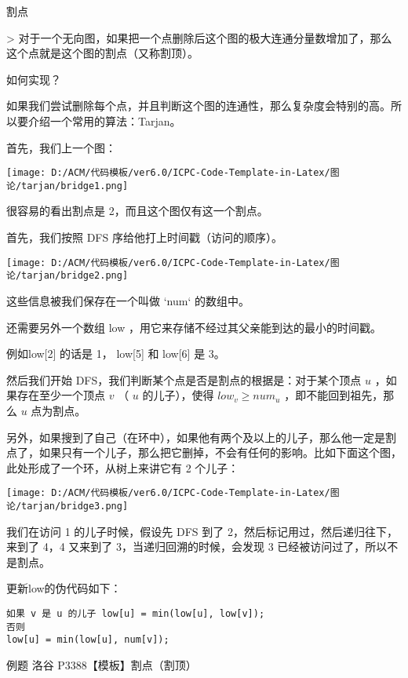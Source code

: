 割点

> 对于一个无向图，如果把一个点删除后这个图的极大连通分量数增加了，那么这个点就是这个图的割点（又称割顶）。

如何实现？

如果我们尝试删除每个点，并且判断这个图的连通性，那么复杂度会特别的高。所以要介绍一个常用的算法：Tarjan。

首先，我们上一个图：

\texttt{[image: D:/ACM/代码模板/ver6.0/ICPC-Code-Template-in-Latex/图论/tarjan/bridge1.png]}

很容易的看出割点是 2，而且这个图仅有这一个割点。

首先，我们按照 DFS 序给他打上时间戳（访问的顺序）。

\texttt{[image: D:/ACM/代码模板/ver6.0/ICPC-Code-Template-in-Latex/图论/tarjan/bridge2.png]}

这些信息被我们保存在一个叫做 `num` 的数组中。

还需要另外一个数组 low ，用它来存储不经过其父亲能到达的最小的时间戳。

例如low[2] 的话是 1， low[5] 和 low[6] 是 3。

然后我们开始 DFS，我们判断某个点是否是割点的根据是：对于某个顶点 $u$ ，如果存在至少一个顶点 $v$ （ $u$ 的儿子），使得 $low_v \geq num_u$ ，即不能回到祖先，那么 $u$ 点为割点。

另外，如果搜到了自己（在环中），如果他有两个及以上的儿子，那么他一定是割点了，如果只有一个儿子，那么把它删掉，不会有任何的影响。比如下面这个图，此处形成了一个环，从树上来讲它有 2 个儿子：

\texttt{[image: D:/ACM/代码模板/ver6.0/ICPC-Code-Template-in-Latex/图论/tarjan/bridge3.png]}

我们在访问 1 的儿子时候，假设先 DFS 到了 2，然后标记用过，然后递归往下，来到了 4，4 又来到了 3，当递归回溯的时候，会发现 3 已经被访问过了，所以不是割点。

更新low的伪代码如下：

\begin{lstlisting}
如果 v 是 u 的儿子 low[u] = min(low[u], low[v]);
否则
low[u] = min(low[u], num[v]);
\end{lstlisting}


例题
洛谷 P3388【模板】割点（割顶）
